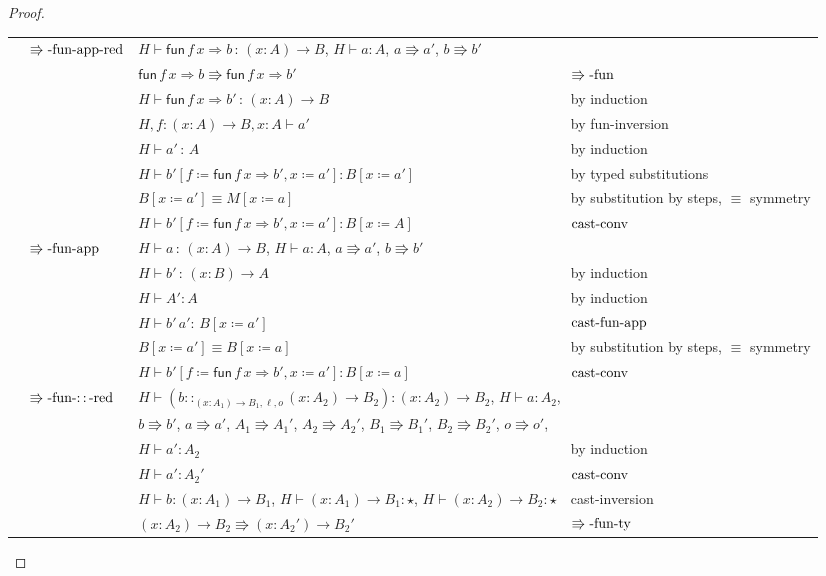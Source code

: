 \begin{proof}
\begin{tabular}{llll}
 & $\operatorname{\Rrightarrow-fun-app-red}$ & \multicolumn{2}{l}{$H\vdash\mathsf{fun}\,f\,x\Rightarrow b\,:\,\left(x:A\right)\rightarrow B$,
$H\vdash a:A$, $a\Rrightarrow a'$, $b\Rrightarrow b'$}\tabularnewline
 &  & $\mathsf{fun}\,f\,x\Rightarrow b\Rrightarrow\mathsf{fun}\,f\,x\Rightarrow b'$ & $\operatorname{\Rrightarrow-fun}$\tabularnewline
 &  & $H\vdash\mathsf{fun}\,f\,x\Rightarrow b'\,:\,\left(x:A\right)\rightarrow B$ & by induction\tabularnewline
 &  & $H,f:\left(x:A\right)\rightarrow B,x:A\vdash a'$ & by fun-inversion\tabularnewline
 &  & $H\vdash a'\,:\,A$ & by induction\tabularnewline
 &  & $H\vdash b'\left[f\coloneqq\mathsf{fun}\,f\,x\Rightarrow b',x\coloneqq a'\right]:B\left[x\coloneqq a'\right]$ & by typed substitutions\tabularnewline
 &  & $B\left[x\coloneqq a'\right]\equiv M\left[x\coloneqq a\right]$ & by substitution by steps, $\equiv$ symmetry\tabularnewline
 &  & $H\vdash b'\left[f\coloneqq\mathsf{fun}\,f\,x\Rightarrow b',x\coloneqq a'\right]:B\left[x\coloneqq A\right]$ & $\operatorname{cast-conv}$\tabularnewline
 & $\operatorname{\Rrightarrow-fun-app}$ & $H\vdash a\,:\,\left(x:A\right)\rightarrow B$, $H\vdash a:A$, $a\Rrightarrow a'$,
$b\Rrightarrow b'$ & \tabularnewline
 &  & $H\vdash b'\,:\,\left(x:B\right)\rightarrow A$ & by induction\tabularnewline
 &  & $H\vdash A':A$ & by induction\tabularnewline
 &  & $H\vdash b'\,a':\,B\left[x\coloneqq a'\right]$ & $\operatorname{cast-fun-app}$\tabularnewline
 &  & $B\left[x\coloneqq a'\right]\equiv B\left[x\coloneqq a\right]$ & by substitution by steps, $\equiv$ symmetry\tabularnewline
 &  & $H\vdash b'\left[f\coloneqq\mathsf{fun}\,f\,x\Rightarrow b',x\coloneqq a'\right]:B\left[x\coloneqq a\right]$ & $\operatorname{cast-conv}$\tabularnewline
 & $\operatorname{\Rrightarrow-fun-::-red}$ & \multicolumn{2}{l}{$H\vdash\left(b::_{\left(x:A_{1}\right)\rightarrow B_{1},\ensuremath{\ell},o}\left(x:A_{2}\right)\rightarrow B_{2}\right):\left(x:A_{2}\right)\rightarrow B_{2}$,
$H\vdash a:A_{2}$, }\tabularnewline
 &  & \multicolumn{2}{l}{$b\Rrightarrow b'$, $a\Rrightarrow a'$, $A_{1}\Rrightarrow A_{1}'$,
$A_{2}\Rrightarrow A_{2}'$, $B_{1}\Rrightarrow B_{1}'$, $B_{2}\Rrightarrow B_{2}'$,
$o\Rrightarrow o'$, }\tabularnewline
 &  & $H\vdash a':A_{2}$ & by induction\tabularnewline
 &  & $H\vdash a':A_{2}'$ & $\operatorname{cast-conv}$\tabularnewline
 &  & $H\vdash b:\left(x:A_{1}\right)\rightarrow B_{1}$, $H\vdash\left(x:A_{1}\right)\rightarrow B_{1}:\star$,
$H\vdash\left(x:A_{2}\right)\rightarrow B_{2}:\star$ & cast-inversion \tabularnewline
 &  & $\left(x:A_{2}\right)\rightarrow B_{2}\Rrightarrow\left(x:A_{2}'\right)\rightarrow B_{2}'$ & $\operatorname{\Rrightarrow-fun-ty}$\tabularnewline

\end{tabular}
\end{proof}
